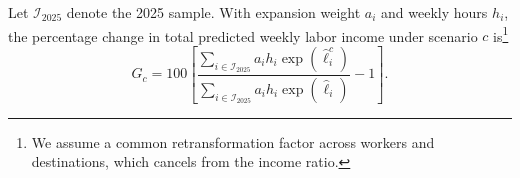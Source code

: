 Let \(\mathcal I_{2025}\) denote the 2025 sample. With expansion weight
\(a_i\) and weekly hours \(h_i\), the percentage change in total
predicted weekly labor income under scenario \(c\) is\footnote{We assume a
common retransformation factor across workers and destinations, which
cancels from the income ratio.}
\begin{equation}\label{eq:income-counterfactual}
  G_c=100\left[
  \frac{\sum_{i\in\mathcal I_{2025}}a_i h_i
        \exp(\widehat{\ell}_i^c)}
       {\sum_{i\in\mathcal I_{2025}}a_i h_i
        \exp(\widehat{\ell}_i)}-1\right].
\end{equation}
